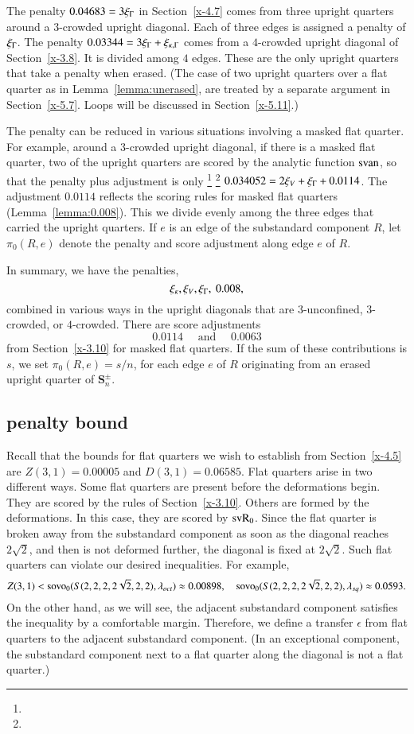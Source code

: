 The penalty $0.04683 = 3\xi_\Gamma$ in Section~\ref{x-4.7} comes from
three upright quarters around a $3$-crowded upright diagonal. Each
of three edges is assigned a penalty of $\xi_\Gamma$.  The penalty
$0.03344=3\xi_\Gamma+\xi_{\kappa,\Gamma}$ comes from a $4$-crowded upright diagonal of
Section~\ref{x-3.8}. It is divided among $4$ edges. These are the
only upright quarters that take a penalty when erased. (The case
of two upright quarters over a flat quarter as in
Lemma~\ref{lemma:unerased}, are treated by a separate argument in
Section~\ref{x-5.7}. Loops will be discussed in
Section~\ref{x-5.11}.)

The penalty can be reduced in various situations involving a
masked flat quarter.  For example, around a $3$-crowded upright
diagonal, if there is a masked flat quarter, two of the upright
quarters are scored by the analytic  function ${\operatorname{svan}}$, so that the
penalty plus adjustment is only%
\footnote{} %
\footnote{} %
 $0.034052=2\xi_V+\xi_\Gamma+0.0114$.
The adjustment $0.0114$ reflects the scoring
rules for masked flat quarters (Lemma~\ref{lemma:0.008}).  This we
divide evenly among the three edges that carried the upright
quarters. If $e$ is an edge of the substandard component $R$, let $\pi_0(R,e)$
denote the penalty and score adjustment along edge $e$ of $R$.

In summary, we have the penalties,
    $$\xi_\kappa,\xi_V,\xi_\Gamma,\ 0.008,$$
combined in various ways in the upright diagonals that are
$3$-unconfined, $3$-crowded, or $4$-crowded.  There are score
adjustments
    $$0.0114\quad \text{ and }\quad 0.0063$$
from Section~\ref{x-3.10} for masked flat quarters.  If the sum of these
contributions is $s$, we set $\pi_0(R,e)=s/n$, for each edge $e$ of $R$
originating from an erased upright quarter of
    $\mathcal{\mathbf S}_n^\pm$.

\subsection{penalty bound} %

Recall that the bounds for flat quarters we wish to establish from
Section~\ref{x-4.5} are $Z(3,1)=0.00005$ and $D(3,1)=0.06585$. Flat
quarters arise in two different ways.  Some flat quarters are present
before the deformations begin.  They are scored by the rules of
Section~\ref{x-3.10}. Others are formed by the deformations.  In this
case, they are scored by ${\operatorname{svR}}_0$. Since the flat quarter is broken away
from the substandard component as soon as the diagonal reaches $2\sqrt{2}$, and then
is not deformed further, the diagonal is fixed at $2\sqrt{2}$.  Such
flat quarters can violate our desired inequalities. For example,
    $$
    Z(3,1)<{\operatorname{sovo}}_0(S(2,2,2,2\sqrt{2},2,2),\lambda_{oct}) 
      \approx 0.00898,\quad
        {\operatorname{sovo}}_0(S(2,2,2,2\sqrt{2},2,2),\lambda_{sq})\approx 0.0593.
    $$
On the other hand, as we will see, the adjacent substandard component satisfies the
inequality by a comfortable margin.  Therefore, we define a transfer
$\epsilon$ from flat quarters to the adjacent substandard component. (In an
exceptional component, the substandard component next to a flat quarter along the
diagonal is not a flat quarter.)

